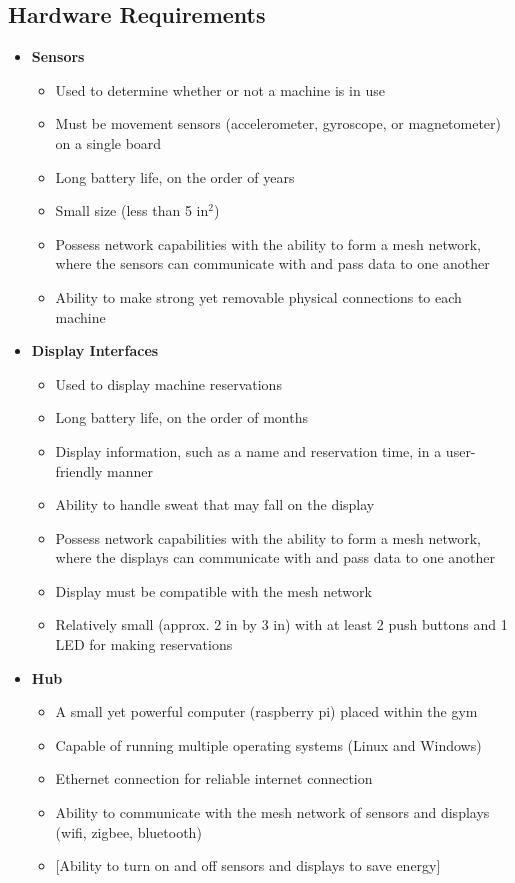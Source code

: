 \documentclass[letterpaper,11pt]{./templates/texMemo} %
\begin{document}
\subsection{Hardware Requirements}

    \begin{itemize}
    \item{\textbf{Sensors}}
    \begin{itemize}
        \item{Used to determine whether or not a machine is in use}
        \item{Must be movement sensors (accelerometer, gyroscope, or magnetometer) on a single board}
        \item{Long battery life, on the order of years}
        \item{Small size (less than 5 in$^2$)}
        \item{Possess network capabilities with the ability to form a mesh network, where the sensors can communicate with and pass data to one another}
        \item{Ability to make strong yet removable physical connections to each machine}
    \end{itemize}
    
    \item{\textbf{Display Interfaces}}
    \begin{itemize}
        \item{Used to display machine reservations}
        \item{Long battery life, on the order of months}
        \item{Display information, such as a name and reservation time, in a user-friendly manner}
        \item{Ability to handle sweat that may fall on the display}
        \item{Possess network capabilities with the ability to form a mesh network, where the displays can communicate with and pass data to one another}
        \item{Display must be compatible with the mesh network}
        \item{Relatively small (approx. 2 in by 3 in) with at least 2 push buttons and 1 LED for making reservations}
    \end{itemize}
    
    \item{\textbf{Hub}}
    \begin{itemize}
        \item{A small yet powerful computer (raspberry pi) placed within the gym}
        \item{Capable of running multiple operating systems (Linux and Windows)}
        \item{Ethernet connection for reliable internet connection}
        \item{Ability to communicate with the mesh network of sensors and displays (wifi, zigbee, bluetooth)}
        \item{[Ability to turn on and off sensors and displays to save energy]}
    \end{itemize}
    

\end{itemize}
\end{document}
